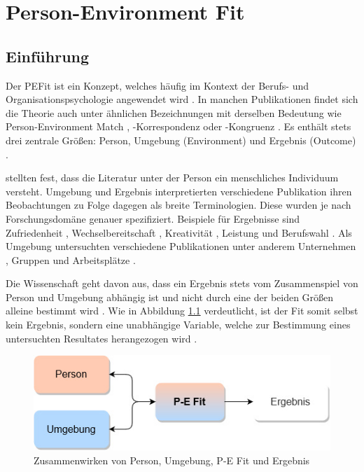 \chapter{Person-Environment Fit}
\label{ch:personEnvironmentFit}

\section{Einführung}
\label{ch:personEnvironmentFit:einfuehrung}
Der \acf{PEFit} \cite[S. 428]{dawis:2002} ist ein Konzept, welches häufig im Kontext der Berufs- und Organisationspsychologie angewendet wird \cite[S. 2]{guan:2021}. In manchen Publikationen findet sich die Theorie auch unter ähnlichen Bezeichnungen mit derselben Bedeutung wie Person-Environment Match \cite[S. 2]{player:2017}, -Korrespondenz \cite[S. 1]{eggerth:2008} oder -Kongruenz \cite[S. 1]{muchinsky:1987}. Es enthält stets drei zentrale Größen: Person, Umgebung (Environment) und Ergebnis (Outcome) \cite[S. 2f.]{livingstone:1997}.

\textcite[S. 5]{edwards:2007} stellten fest, dass die Literatur unter der Person ein menschliches Individuum versteht. Umgebung und Ergebnis interpretierten verschiedene Publikation ihren Beobachtungen zu Folge dagegen als breite Terminologien. Diese wurden je nach Forschungsdomäne genauer spezifiziert. Beispiele für Ergebnisse sind Zufriedenheit \cite[S. 1]{lashani:2021}, Wechselbereitschaft \cite[S. 1]{amarneh:2021}, Kreativität \cite[S. 1]{duan:2019}, Leistung \cite[S. 7f.]{elfenbein:2007} und  Berufswahl \cite[S. 1]{cable:1996}. Als Umgebung untersuchten verschiedene Publikationen unter anderem Unternehmen \cite[S. 1]{kristof:1996}, Gruppen \cite[S. 1]{werbel:2001} und Arbeitsplätze \cite[S. 1]{lu:2014}.

Die Wissenschaft geht davon aus, dass ein Ergebnis stets vom Zusammenspiel von Person und Umgebung abhängig ist und nicht durch eine der beiden Größen alleine bestimmt wird \cite[S. 1]{muchinsky:1987}. Wie in Abbildung \ref{fig:personEnvironmentFit:einfuehrung:abb1} verdeutlicht, ist der Fit somit selbst kein Ergebnis, sondern eine unabhängige Variable, welche zur Bestimmung eines untersuchten Resultates herangezogen wird \cite[S. 4f.]{edwards:1991}.

\begin{figure}[h]
	\centering
	\includegraphics[width=1\textwidth]{gfx/P-E Fit.jpg}
	\caption{Zusammenwirken von Person, Umgebung, P-E Fit und Ergebnis}
	\label{fig:personEnvironmentFit:einfuehrung:abb1}
\end{figure}

